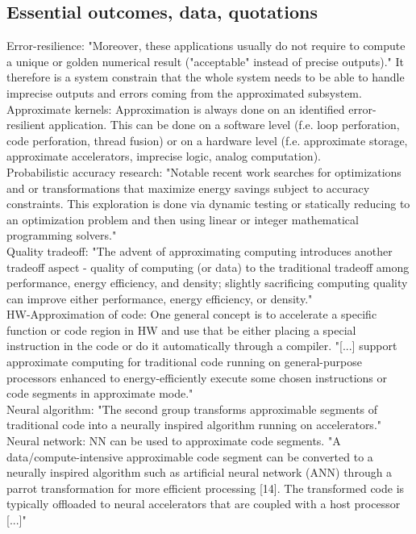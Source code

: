\subsection*{Essential outcomes, data, quotations}
Error-resilience: "Moreover, these applications usually do not require to compute a unique or golden numerical result ("acceptable" instead of precise outputs)." It therefore is a system constrain that the whole system needs to be able to handle imprecise outputs and errors coming from the approximated subsystem.\\
Approximate kernels: Approximation is always done on an identified error-resilient application. This can be done on a software level (f.e. loop perforation, code perforation, thread fusion) or on a hardware level (f.e. approximate storage, approximate accelerators, imprecise logic, analog computation).\\
Probabilistic accuracy research: "Notable recent work searches for optimizations and or transformations that maximize energy savings subject to accuracy constraints. This exploration is done via dynamic testing or statically reducing to an optimization problem and then using linear or integer mathematical programming solvers."\\
Quality tradeoff: "The advent of approximating computing introduces another tradeoff aspect - quality of computing
(or data) to the traditional tradeoff among performance, energy efficiency, and density; slightly sacrificing computing quality can improve either performance, energy efficiency, or density."\\
HW-Approximation of code: One general concept is to accelerate a specific function or code region in HW and use that be either placing a special instruction in the code or do it automatically through a compiler. "[...] support
approximate computing for traditional code running on general-purpose processors enhanced to energy-efficiently execute some chosen instructions or code segments in approximate mode."\\
Neural algorithm: "The second group transforms approximable segments of traditional code into a neurally inspired algorithm running on accelerators."\\
Neural network: NN can be used to approximate code segments. "A data/compute-intensive approximable code segment can be converted to a neurally inspired algorithm such as artificial neural network (ANN) through a parrot transformation for more efficient processing [14]. The transformed code is typically offloaded to neural accelerators that are coupled with a host processor [...]"\\
